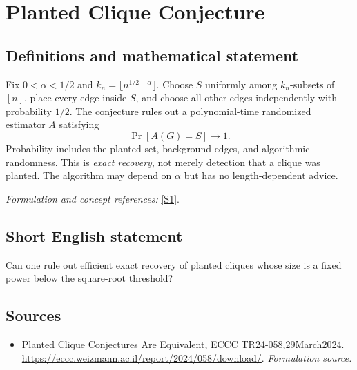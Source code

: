 \documentclass[11pt]{article}
\begin{document}
\section*{\texorpdfstring{Planted Clique Conjecture}{Planted Clique Conjecture}}\label{132}
\subsection{Definitions and mathematical statement}
Fix $0<\alpha<1/2$ and $k_n=\lfloor n^{1/2-\alpha}\rfloor$. Choose $S$ uniformly among $k_n$-subsets of $[n]$, place every edge inside $S$, and choose all other edges independently with probability $1/2$. The conjecture rules out a polynomial-time randomized estimator $A$ satisfying
\[
 \Pr[A(G)=S]\longrightarrow1.
\]
Probability includes the planted set, background edges, and algorithmic randomness. This is \emph{exact recovery}, not merely detection that a clique was planted. The algorithm may depend on $\alpha$ but has no length-dependent advice.
\par\smallskip\textit{Formulation and concept references:} \href{https://eccc.weizmann.ac.il/report/2024/058/download/}{[S1]}.

\subsection{Short English statement}
Can one rule out efficient exact recovery of planted cliques whose size is a fixed power below the square-root threshold?
\subsection{Sources}
\begin{itemize}
\item[S1]Planted Clique Conjectures Are Equivalent, ECCC TR24-058,29March2024.
\url{https://eccc.weizmann.ac.il/report/2024/058/download/}.
\textit{Formulation source.}
\end{itemize}
\end{document}

